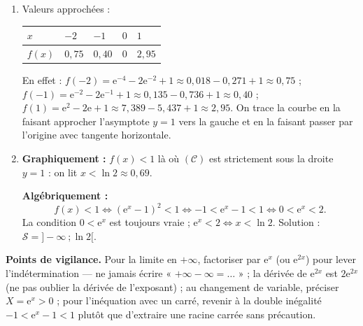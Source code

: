 \documentclass[11pt]{article}
\begin{document}
\begin{corrige}
\begin{enumerate}
\item Valeurs approchées :
\begin{center}
\begin{tabularx}{\linewidth}{|l|X|X|X|X|}\hline
\rowcolor{popblueL} $x$ & $-2$ & $-1$ & $0$ & $1$ \\ \hline
$f(x)$ & $0{,}75$ & $0{,}40$ & $0$ & $2{,}95$ \\ \hline
\end{tabularx}
\end{center}
En effet : $f(-2) = \mathrm{e}^{-4} - 2\mathrm{e}^{-2} + 1 \approx 0{,}018 - 0{,}271 + 1 \approx 0{,}75$ ; $f(-1) = \mathrm{e}^{-2} - 2\mathrm{e}^{-1} + 1 \approx 0{,}135 - 0{,}736 + 1 \approx 0{,}40$ ; $f(1) = \mathrm{e}^2 - 2\mathrm{e} + 1 \approx 7{,}389 - 5{,}437 + 1 \approx 2{,}95$. On trace la courbe en la faisant approcher l'asymptote $y = 1$ vers la gauche et en la faisant passer par l'origine avec tangente horizontale.
\item \textbf{Graphiquement :} $f(x) < 1$ là où $(\mathcal{C})$ est strictement sous la droite $y = 1$ : on lit $x < \ln 2 \approx 0{,}69$.

\textbf{Algébriquement :}
\[ f(x) < 1 \iff \left(\mathrm{e}^x - 1\right)^2 < 1 \iff -1 < \mathrm{e}^x - 1 < 1 \iff 0 < \mathrm{e}^x < 2. \]
La condition $0 < \mathrm{e}^x$ est toujours vraie ; $\mathrm{e}^x < 2 \iff x < \ln 2$. Solution : $\boxed{\mathcal{S} = ]-\infty\ ; \ln 2[}$.
\end{enumerate}

\textbf{Points de vigilance.} Pour la limite en $+\infty$, factoriser par $\mathrm{e}^x$ (ou $\mathrm{e}^{2x}$) pour lever l'indétermination — ne jamais écrire « $+\infty - \infty = \ldots$ » ; la dérivée de $\mathrm{e}^{2x}$ est $2\mathrm{e}^{2x}$ (ne pas oublier la dérivée de l'exposant) ; au changement de variable, préciser $X = \mathrm{e}^x > 0$ ; pour l'inéquation avec un carré, revenir à la double inégalité $-1 < \mathrm{e}^x - 1 < 1$ plutôt que d'extraire une racine carrée sans précaution.
\end{corrige}
\end{document}
